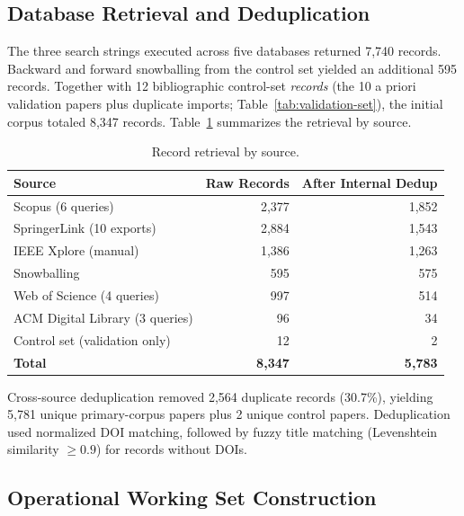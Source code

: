 \subsection{Database Retrieval and Deduplication}

The three search strings executed across five databases returned 7{,}740
records. Backward and forward snowballing from the control set yielded an
additional 595 records. Together with 12 bibliographic control-set \emph{records} (the 10 a priori
validation papers plus duplicate imports; Table~\ref{tab:validation-set}),
the initial corpus totaled 8{,}347 records.
Table~\ref{tab:retrieval} summarizes the retrieval by source.

\begin{table}[htbp]
\centering
\caption{Record retrieval by source.}
\label{tab:retrieval}
\begin{tabular}{lrr}
\toprule
\textbf{Source} & \textbf{Raw Records} & \textbf{After Internal Dedup} \\
\midrule
Scopus (6 queries)      & 2{,}377 & 1{,}852 \\
SpringerLink (10 exports) & 2{,}884 & 1{,}543 \\
IEEE Xplore (manual)    & 1{,}386 & 1{,}263 \\
Snowballing             &   595   &   575   \\
Web of Science (4 queries) & 997  &   514   \\
ACM Digital Library (3 queries) & 96 &  34  \\
Control set (validation only) & 12 &    2   \\
\midrule
\textbf{Total} & \textbf{8{,}347} & \textbf{5{,}783} \\
\bottomrule
\end{tabular}
\end{table}

Cross-source deduplication removed 2{,}564 duplicate records (30.7\%),
yielding 5{,}781 unique primary-corpus papers plus 2 unique control papers.
Deduplication used normalized DOI matching, followed by fuzzy title matching
(Levenshtein similarity $\geq 0.9$) for records without DOIs.

\subsection{Operational Working Set Construction}

